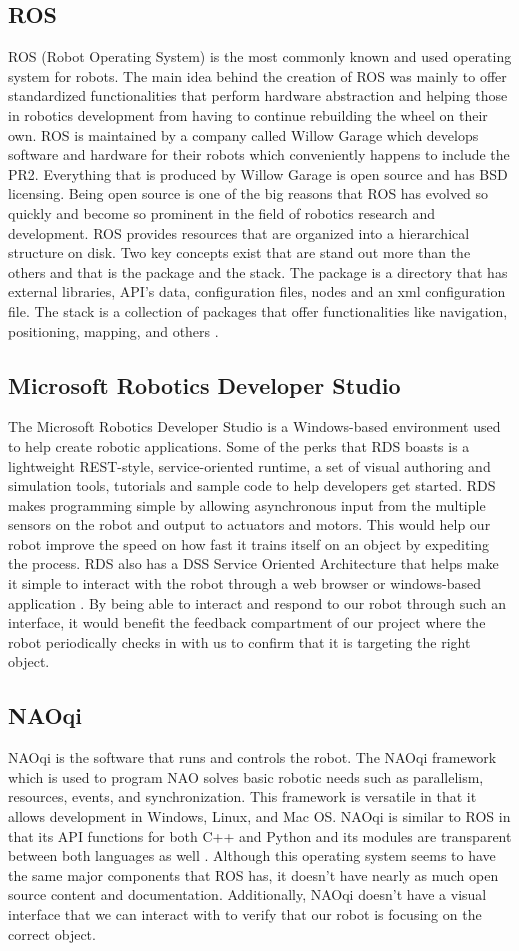 \documentclass[draftclsnofoot, onecolumn, 10pt, compsoc]{IEEEtran}
\begin{document}
\subsection{ROS}
ROS (Robot Operating System) is the most commonly known and used operating system for robots. The main idea behind the creation of ROS was mainly to offer standardized functionalities that perform hardware abstraction and helping those in robotics development from having to continue rebuilding the wheel on their own. ROS is maintained by a company called Willow Garage which develops software and hardware for their robots which conveniently happens to include the PR2. Everything that is produced by Willow Garage is open source and has BSD licensing. Being open source is one of the big reasons that ROS has evolved so quickly and become so prominent in the field of robotics research and development. ROS provides resources that are organized into a hierarchical structure on disk. Two key concepts exist that are stand out more than the others and that is the package and the stack. The package is a directory that has external libraries, API’s data, configuration files, nodes and an xml configuration file. The stack is a collection of packages that offer functionalities like navigation, positioning, mapping, and others \cite{ROSintro}.
\subsection{Microsoft Robotics Developer Studio}
The Microsoft Robotics Developer Studio is a Windows-based environment used to help create robotic applications. Some of the perks that RDS boasts is a lightweight REST-style, service-oriented runtime, a set of visual authoring and simulation tools, tutorials and sample code to help developers get started. RDS makes programming simple by allowing asynchronous input from the multiple sensors on the robot and output to actuators and motors. This would help our robot improve the speed on how fast it trains itself on an object by expediting the process. RDS also has a DSS Service Oriented Architecture that helps make it simple to interact with the robot through a web browser or windows-based application \cite{MSrobo}. By being able to interact and respond to our robot through such an interface, it would benefit the feedback compartment of our project where the robot periodically checks in with us to confirm that it is targeting the right object.
\subsection{NAOqi}
NAOqi is the software that runs and controls the robot. The NAOqi framework which is used to program NAO solves basic robotic needs such as parallelism, resources, events, and synchronization. This framework is versatile in that it allows development in Windows, Linux, and Mac OS. NAOqi is similar to ROS in that its API functions for both C++ and Python and its modules are transparent between both languages as well \cite{NAOqi}. Although this operating system seems to have the same major components that ROS has, it doesn’t have nearly as much open source content and documentation. Additionally, NAOqi doesn’t have a visual interface that we can interact with to verify that our robot is focusing on the correct object.
\end{document}
